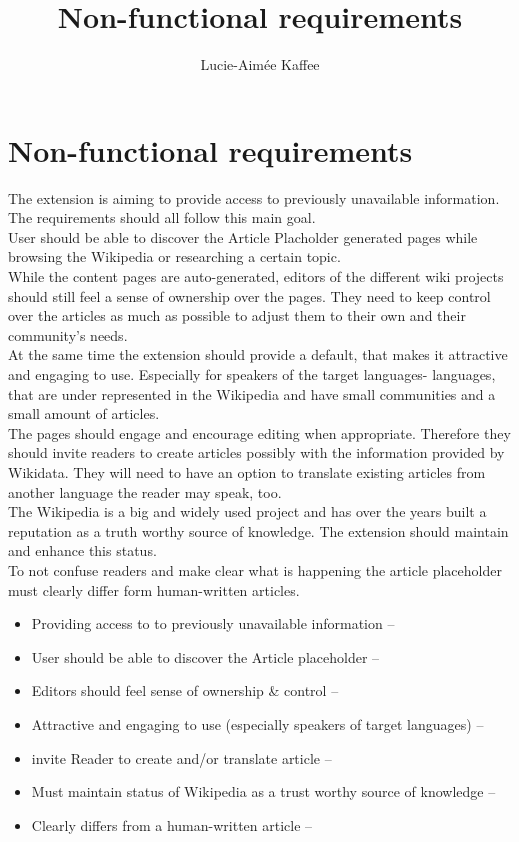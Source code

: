 \documentclass[11pt]{article}
\title {{Non-functional requirements}}
\author {Lucie-Aim\'{e}e Kaffee}
\date{}
\begin{document}
  \section{Non-functional requirements}

  The extension is aiming to provide access to previously unavailable information. The requirements should all follow this main goal. \\
  User should be able to discover the Article Placholder generated pages while browsing the Wikipedia or researching a certain topic. \\
  While the content pages are auto-generated, editors of the different wiki projects should still feel a sense of ownership over the pages. They need to keep control over the articles as much as possible to adjust them to their own and their community's needs.  \\
  At the same time the extension should provide a default, that makes it attractive and engaging to use. Especially for speakers of the target languages- languages, that are under represented in the Wikipedia and have small communities and a small amount of articles. \\
  The pages should engage and encourage editing when appropriate. Therefore they should invite readers to create articles possibly with the information provided by Wikidata. They will need to have an option to translate existing articles from another language the reader may speak, too. \\
  The Wikipedia is a big and widely used project and has over the years built a reputation as a truth worthy source of knowledge. The extension should maintain and enhance this status. \\
  To not confuse readers and make clear what is happening the article placeholder must clearly differ form human-written articles. \\


  \begin{itemize}
    \item Providing access to to previously unavailable information --
    \item User should be able to discover the Article placeholder -- 
    \item Editors should feel sense of ownership \& control -- 
    \item Attractive and engaging to use (especially speakers of target languages) --
    \item invite Reader to create and/or translate article --
    \item Must maintain status of Wikipedia as a trust worthy source of knowledge --
    \item Clearly differs from a human-written article --
  \end{itemize}
\end{document}
